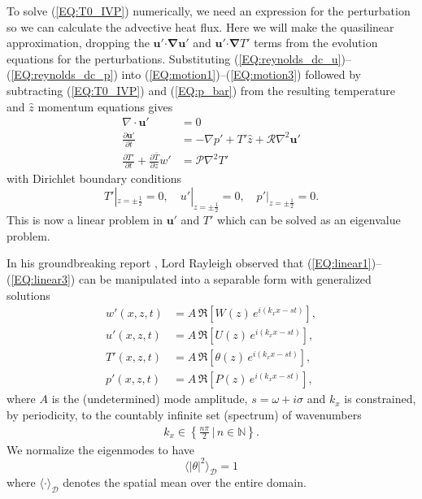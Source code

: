 \documentclass[reprint,amsmath,amssymb,aps]{revtex4-1}
\renewcommand{\vec}[1]{\boldsymbol{#1}}
\newcommand{\eq}[1]{(\ref{#1})}
\newcommand{\eqss}[2]{(\ref{#1})--(\ref{#2})}
\begin{document}
To solve \eq{EQ:T0_IVP} numerically, we need an expression for the perturbation so we can calculate the advective heat flux.
Here we will make the quasilinear approximation, dropping the $\vec{u}'\vec{\cdot}\vec{\nabla}\vec{u}'$ and $\vec{u}'\vec{\cdot}\vec{\nabla}T'$ terms from the evolution equations for the perturbations.
Substituting \eqss{EQ:reynolds_dc_u}{EQ:reynolds_dc_p} into \eqss{EQ:motion1}{EQ:motion3} followed by subtracting \eq{EQ:T0_IVP} and \eq{EQ:p_bar} from the resulting temperature and $\hat{z}$ momentum equations gives
\begin{align}
    \nabla \cdot \vec{u'} &= 0 \label{EQ:linear1}\\
    \frac{\partial\vec{u'}}{\partial t} &= - \nabla p' + T'\hat{z} + \mathcal{R} \nabla^2 \vec{u'} \label{EQ:linear2}\\
    \frac{\partial T'}{\partial t} + \frac{\partial \bar{T}}{\partial z} w' &= \mathcal{P} \nabla^2 T' \label{EQ:linear3}
\end{align}
with Dirichlet boundary conditions 
\begin{equation}
    T'|_{z = \pm \frac{1}{2}} = 0, \quad u'|_{z = \pm \frac{1}{2}} = 0, \quad p'|_{z = \pm \frac{1}{2}} = 0.
\end{equation}
This is now a linear problem in $\vec{u}'$ and $T'$ which can be solved as an eigenvalue problem.

In his groundbreaking report \cite{Rayleigh_1916}, Lord Rayleigh observed that \eqss{EQ:linear1}{EQ:linear3} can be manipulated into a separable form with generalized solutions
\begin{align}
    w'(x, z, t) &= A\, \Re\left[W(z) \, e^{i(k_xx-st)}\right], \label{EQ:normal_modes1}\\ 
    u'(x, z, t) &= A\, \Re\left[U(z) \, e^{i(k_xx-st)}\right], \label{EQ:normal_modes2}\\ 
    T'(x, z, t) &= A\, \Re\left[\theta(z) \, e^{i(k_xx-st)}\right], \label{EQ:normal_modes3}\\ 
    p'(x, z, t) &= A\, \Re\left[P(z) \, e^{i(k_xx-st)}\right], \label{EQ:normal_modes4}
\end{align}
where $A$ is the (undetermined) mode amplitude, $s = \omega + i\sigma$ and $k_x$ is constrained, by periodicity, to the countably infinite set (spectrum) of wavenumbers
\begin{align}
    k_x \in \left\{\frac{n\pi}{2} \, \big| \, n \in \mathbb{N}\right\}.
\end{align}
We normalize the eigenmodes to have
\begin{equation}
  \langle |\theta|^2 \rangle_{\mathcal{D}} = 1
\end{equation}
where $\langle \cdot \rangle_{\mathcal{D}}$ denotes the spatial mean over the entire domain.
\end{document}
